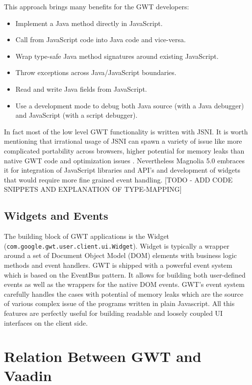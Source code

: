 This approach brings many benefits for the GWT developers\cite{jsni}:
\begin{itemize} 
	\item Implement a Java method directly in JavaScript.
	\item Call from JavaScript code into Java code and vice-versa.
	\item Wrap type-safe Java method signatures around existing JavaScript.
	\item Throw exceptions across Java/JavaScript boundaries.
	\item Read and write Java fields from JavaScript.
	\item Use a development mode to debug both Java source (with a Java debugger) and JavaScript (with a script debugger).
\end{itemize}
In fact most of the low level GWT functionality is written with JSNI. It is
worth mentioning that irrational usage of JSNI can spawn a variety of issue like
more complicated portability across browsers, higher potential for memory leaks
than native GWT code and optimization issues \cite{jsni}. Nevertheless Magnolia
5.0 embraces it for integration of JavaScript libraries and API's and
development of widgets that would require more fine grained event handling.
[TODO - ADD CODE SNIPPETS AND EXPLANATION OF TYPE-MAPPING]

\subsection{Widgets and Events} 
The building block of GWT applications is the Widget
(\texttt{com.google.gwt.user.client.ui.Widget}).
Widget is typically a wrapper around a set of Document Object Model (DOM)
elements with business logic methods and event handlers. GWT is shipped with a
powerful event system which is based on the EventBus pattern. It allows for
building both user-defined events as well as the wrappers for the native DOM
events. GWT's event system carefully handles the cases with potential of memory
leaks \cite{gwt_memory_leaks} which are the source of various complex issue of
the programs written in plain Javascript. All this features are perfectly useful
for building readable and loosely coupled UI interfaces on the client side.

\section{Relation Between GWT and Vaadin}
 
